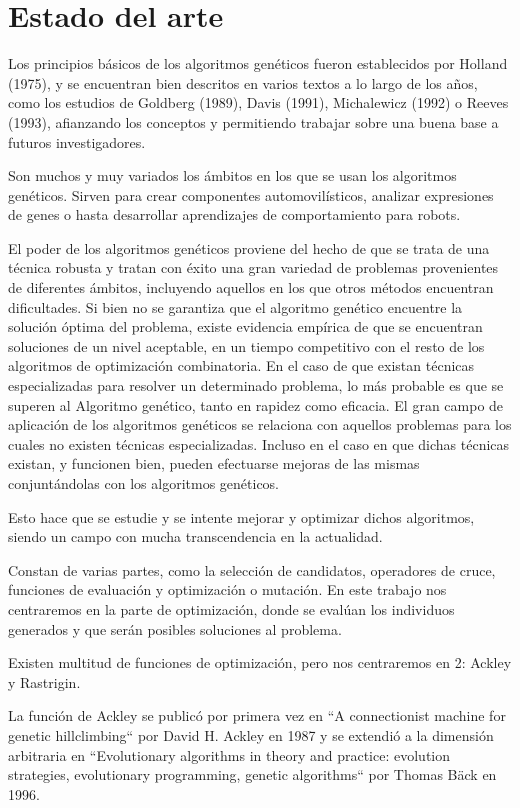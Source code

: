 \chapter{Estado del arte}
\bigskip

Los principios básicos de los algoritmos genéticos fueron establecidos por Holland (1975), y se encuentran bien descritos en varios textos a lo largo de los años, como los estudios de Goldberg (1989), Davis (1991), Michalewicz (1992) o Reeves (1993), afianzando los conceptos y permitiendo trabajar sobre una buena base a futuros investigadores.

\bigskip
Son muchos y muy variados los ámbitos en los que se usan los algoritmos genéticos. Sirven para crear componentes automovilísticos, analizar expresiones de genes o hasta desarrollar aprendizajes de comportamiento para robots.

\bigskip
El poder de los algoritmos genéticos proviene del hecho de que se trata de una técnica robusta y tratan con éxito una gran variedad de problemas provenientes de diferentes ámbitos, incluyendo aquellos en los que otros métodos encuentran dificultades. Si bien no se garantiza que el algoritmo genético encuentre la solución óptima del problema, existe evidencia empírica de que se encuentran soluciones de un nivel aceptable, en un tiempo competitivo con el resto de los algoritmos de optimización combinatoria. En el caso de que existan técnicas especializadas para resolver un determinado problema, lo más probable es que se superen al Algoritmo genético, tanto en rapidez como eficacia. El gran campo de aplicación de los algoritmos genéticos se relaciona con aquellos problemas para los cuales no existen técnicas especializadas. Incluso en el caso en que dichas técnicas existan, y funcionen bien, pueden efectuarse mejoras de las mismas conjuntándolas con los algoritmos genéticos.

Esto hace que se estudie y se intente mejorar y optimizar dichos algoritmos, siendo un campo con mucha transcendencia en la actualidad.

\bigskip
Constan de varias partes, como la selección de candidatos, operadores de cruce, funciones de evaluación y optimización o mutación. En este trabajo nos centraremos en la parte de optimización, donde se evalúan los individuos generados y que serán posibles soluciones al problema.

Existen multitud de funciones de optimización, pero nos centraremos en 2: Ackley y Rastrigin.

\bigskip
La función de Ackley se publicó por primera vez en ``A connectionist machine for genetic hillclimbing`` por David H. Ackley en 1987 y se extendió a la dimensión arbitraria en ``Evolutionary algorithms in theory and practice: evolution strategies, evolutionary programming, genetic algorithms`` por Thomas Bäck en 1996.

